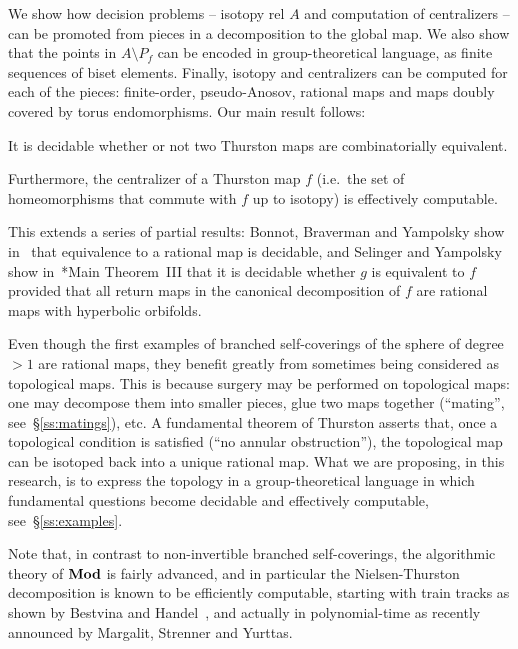 \documentclass{amsart}
\begin{document}
We show how decision problems -- isotopy rel $A$ and computation of
centralizers -- can be promoted from pieces in a decomposition to the global
map. We also show that the points in $A\setminus P_f$ can be encoded in
group-theoretical language, as finite sequences of biset elements. Finally,
isotopy and centralizers can be computed for each of the pieces:
finite-order, pseudo-Anosov, rational maps and maps doubly covered by
torus endomorphisms. Our main result follows:
\begin{mainthm}\label{thm:decidable}
  It is decidable whether or not two Thurston maps are combinatorially
  equivalent.

  Furthermore, the centralizer of a Thurston map $f$ (i.e.\ the set of
  homeomorphisms that commute with $f$ up to isotopy) is effectively
  computable.
\end{mainthm}
This extends a series of partial results: Bonnot, Braverman and
Yampolsky show in~\cite{bonnot-braverman-yampolsky:thurs tondecidable}
that equivalence to a rational map is decidable, and Selinger and
Yampolsky show in~\cite{selinger-yampolsky:geometrization}*{Main
  Theorem~III} that it is decidable whether $g$ is equivalent to $f$
provided that all return maps in the canonical decomposition of $f$
are rational maps with hyperbolic orbifolds.

Even though the first examples of branched self-coverings of the sphere of
degree $>1$ are rational maps, they benefit greatly from sometimes being
considered as topological maps. This is because surgery may be performed on
topological maps: one may decompose them into smaller pieces, glue two maps
together (``mating'', see~\S\ref{ss:matings}), etc. A fundamental theorem
of Thurston asserts that, once a topological condition is satisfied (``no
annular obstruction''), the topological map can be isotoped back into a unique
rational map. What we are proposing, in this research, is to express the
topology in a group-theoretical language in which fundamental questions
become decidable and effectively computable, see~\S\ref{ss:examples}.

Note that, in contrast to non-invertible branched self-coverings, the
algorithmic theory of $\mathbf{\relax Mod}$ is fairly advanced, and in particular the
Nielsen-Thurston decomposition is known to be efficiently computable,
starting with train tracks as shown by Bestvina and
Handel~\cite{bestvina-h:tt}, and actually in polynomial-time as
recently announced by Margalit, Strenner and Yurttas.
\end{document}
